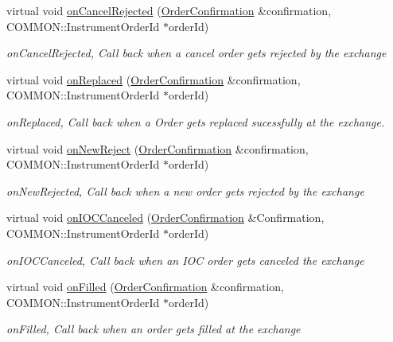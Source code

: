 \begin{DoxyCompactItemize}
virtual void \hyperlink{class_a_p_i2_1_1_s_g_context_ae4ad928457b9cb3d5defaa44640b41d3}{on\-Cancel\-Rejected} (\hyperlink{class_a_p_i2_1_1_order_confirmation}{Order\-Confirmation} \&confirmation, C\-O\-M\-M\-O\-N\-::\-Instrument\-Order\-Id $\ast$order\-Id)
\begin{DoxyCompactList}\small\item\em on\-Cancel\-Rejected, Call back when a cancel order gets rejected by the exchange \end{DoxyCompactList}\item 
virtual void \hyperlink{class_a_p_i2_1_1_s_g_context_a702a97361711e4454518e657d9733ab6}{on\-Replaced} (\hyperlink{class_a_p_i2_1_1_order_confirmation}{Order\-Confirmation} \&confirmation, C\-O\-M\-M\-O\-N\-::\-Instrument\-Order\-Id $\ast$order\-Id)
\begin{DoxyCompactList}\small\item\em on\-Replaced, Call back when a Order gets replaced sucessfully at the exchange. \end{DoxyCompactList}\item 
virtual void \hyperlink{class_a_p_i2_1_1_s_g_context_aa74aca215d051a9dbf1d5e8ee9c1c837}{on\-New\-Reject} (\hyperlink{class_a_p_i2_1_1_order_confirmation}{Order\-Confirmation} \&confirmation, C\-O\-M\-M\-O\-N\-::\-Instrument\-Order\-Id $\ast$order\-Id)
\begin{DoxyCompactList}\small\item\em on\-New\-Rejected, Call back when a new order gets rejected by the exchange \end{DoxyCompactList}\item 
virtual void \hyperlink{class_a_p_i2_1_1_s_g_context_af4705af6aa2806b16882028cb3b85fd6}{on\-I\-O\-C\-Canceled} (\hyperlink{class_a_p_i2_1_1_order_confirmation}{Order\-Confirmation} \&Confirmation, C\-O\-M\-M\-O\-N\-::\-Instrument\-Order\-Id $\ast$order\-Id)
\begin{DoxyCompactList}\small\item\em on\-I\-O\-C\-Canceled, Call back when an I\-O\-C order gets canceled the exchange \end{DoxyCompactList}\item 
virtual void \hyperlink{class_a_p_i2_1_1_s_g_context_a6731a9753ec762623eb9737aaae97432}{on\-Filled} (\hyperlink{class_a_p_i2_1_1_order_confirmation}{Order\-Confirmation} \&confirmation, C\-O\-M\-M\-O\-N\-::\-Instrument\-Order\-Id $\ast$order\-Id)
\begin{DoxyCompactList}\small\item\em on\-Filled, Call back when an order gets filled at the exchange \end{DoxyCompactList}\item 

\end{DoxyCompactItemize}
